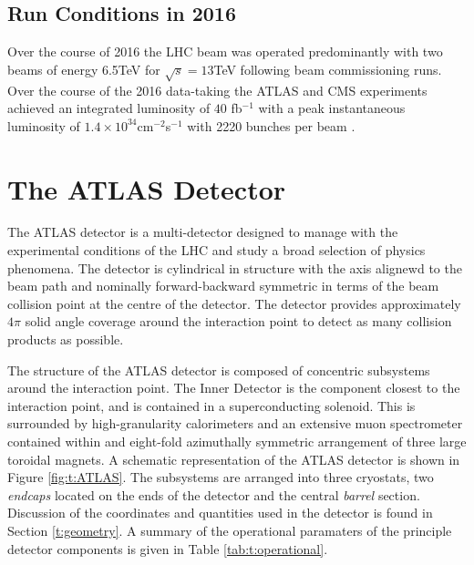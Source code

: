 	\subsection{Run Conditions in 2016}

	Over the course of 2016 the LHC beam was operated predominantly with two beams of energy 6.5TeV for $\sqrt{s}=13$TeV following beam commissioning runs. Over the course of the 2016 data-taking the ATLAS and CMS experiments achieved an integrated luminosity of $40$ fb$^{-1}$ with a peak instantaneous luminosity of $1.4\times10^{34}$cm$^{-2}$s$^{-1}$ with 2220 bunches per beam \cite{Run2016}. 


\section{The ATLAS Detector} 

	The ATLAS detector \cite{ATLAS} is a multi-detector designed to manage with the experimental conditions of the LHC and study a broad selection of physics phenomena. The detector is cylindrical in structure with the axis alignewd to the beam path and nominally forward-backward symmetric in terms of the beam collision point at the centre of the detector. The detector provides approximately $4\pi$ solid angle coverage around the interaction point to detect as many collision products as possible.

	The structure of the ATLAS detector is composed of concentric subsystems around the interaction point.  The Inner Detector is the component closest to the interaction point, and is contained in a superconducting solenoid. This is surrounded by high-granularity calorimeters and an extensive muon spectrometer contained within and eight-fold azimuthally symmetric arrangement of three large toroidal magnets. A schematic representation of the ATLAS detector is shown in Figure \ref{fig:t:ATLAS}. 	The subsystems are arranged into three cryostats, two \textit{endcaps} located on the ends of the detector and the central \textit{barrel} section. Discussion of the coordinates and quantities used in the detector is found in Section \ref{t:geometry}. A summary of the operational paramaters of the principle detector components is given in Table \ref{tab:t:operational}.

